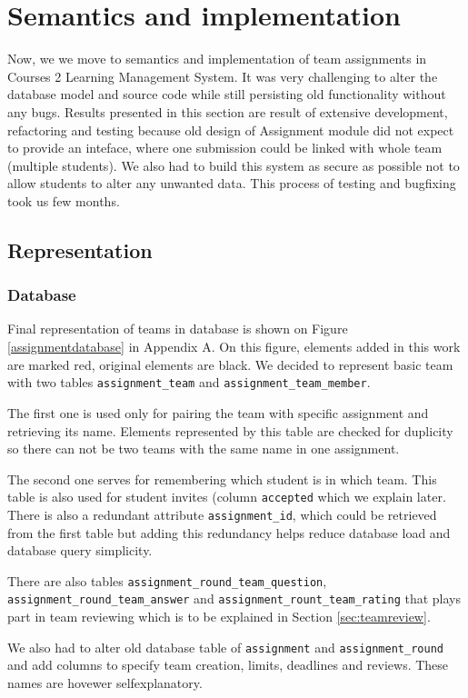 \section{Semantics and implementation}
Now, we we move to semantics and implementation of team assignments in Courses 2 Learning Management System. It was very challenging to alter the database model and source code while still persisting old functionality without any bugs. Results presented in this section are result of extensive development, refactoring and testing because old design of Assignment module did not expect to provide an inteface, where one submission could be linked with whole team (multiple students). We also had to build this system as secure as possible not to allow students to alter any unwanted data. This process of testing and bugfixing took us few months.

\subsection{Representation}

\subsubsection{Database}
Final representation of teams in database is shown on Figure \ref{assignmentdatabase} in Appendix A. On this figure, elements added in this work are marked red, original elements are black. We decided to represent basic team with two tables \texttt{assignment\_team} and \texttt{assignment\_team\_member}.

The first one is used only for pairing the team with specific assignment and retrieving its name. Elements represented by this table are checked for duplicity so there can not be two teams with the same name in one assignment.

The second one serves for remembering which student is in which team. This table is also used for student invites (column \texttt{accepted} which we explain later. There is also a redundant attribute \texttt{assignment\_id}, which could be retrieved from the first table but adding this redundancy helps reduce database load and database query simplicity.

There are also tables \texttt{assignment\_round\_team\_question}, \texttt{assignment\_round\_team\_answer} and \texttt{assignment\_rount\_team\_rating} that plays part in team reviewing which is to be explained in Section \ref{sec:teamreview}.

We also had to alter old database table of \texttt{assignment} and \texttt{assignment\_round} and add columns to specify team creation, limits, deadlines and reviews. These names are hovewer self\-explanatory.


